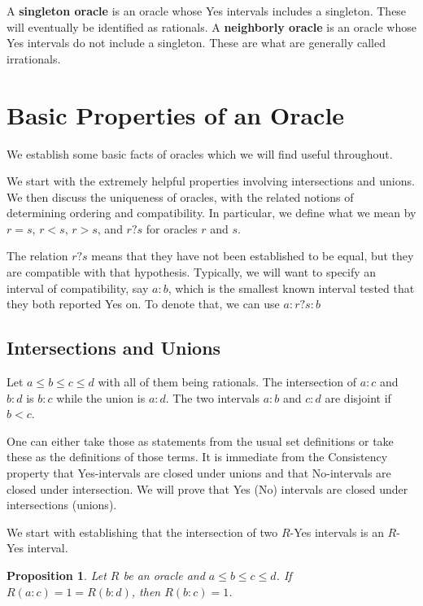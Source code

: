 \documentclass[12pt]{article}
\newtheorem{proposition}{Proposition}
\theoremstyle{remark}
\begin{document}
A \textbf{singleton oracle }is an oracle whose Yes intervals includes a singleton. These will eventually be identified as rationals. A \textbf{neighborly oracle} is an oracle whose Yes intervals do not include a singleton. These are what are generally called irrationals. 



\section{Basic Properties of an Oracle}

We establish some basic facts of oracles which we will find useful throughout. 

We start with the extremely helpful properties involving intersections and unions. We then discuss the uniqueness of oracles, with the related notions of determining ordering and compatibility. In particular, we define what we mean by $r = s$, $r<s$, $r>s$, and $r?s$ for oracles $r$ and $s$. 


The relation $r?s$ means that they have not been established to be equal, but they are compatible with that hypothesis. Typically, we will want to specify an interval of compatibility, say $a:b$, which is the smallest known interval tested that they both reported Yes on. To denote that, we can use $a:r?s:b$ 

\subsection{Intersections and Unions}

Let $a \leq b \leq c \leq d$ with all of them being rationals. The intersection of $a:c$ and $b:d$ is $b:c$ while the union is $a:d$. The two intervals $a:b$ and $c:d$ are disjoint if $b < c$. 

One can either take those as statements from the usual set definitions or take these as the definitions of those terms. It is immediate from the Consistency property that Yes-intervals are closed under unions and that No-intervals are closed under intersection. We will prove that Yes (No) intervals are closed under intersections (unions). 

We start with establishing that the intersection of two $R$-Yes intervals is an $R$-Yes interval.

\begin{proposition}\label{pr:inter}
Let $R$ be an oracle and $a \leq b \leq c \leq d$. If $R(a:c) = 1 = R(b:d)$, then $R(b:c) = 1$.
\end{proposition}
\end{document}
